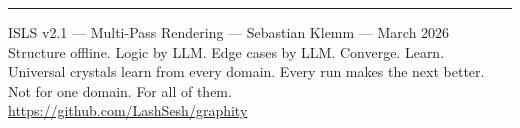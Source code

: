 \documentclass[11pt,a4paper]{article}
\begin{document}
\vfill
\noindent\rule{\textwidth}{0.4pt}
\begin{center}
\small
ISLS v2.1 --- Multi-Pass Rendering --- Sebastian Klemm --- March 2026\\
Structure offline. Logic by LLM. Edge cases by LLM. Converge. Learn.\\
Universal crystals learn from every domain. Every run makes the next better.\\
Not for one domain. For all of them.\\
\url{https://github.com/LashSesh/graphity}
\end{center}
\end{document}
